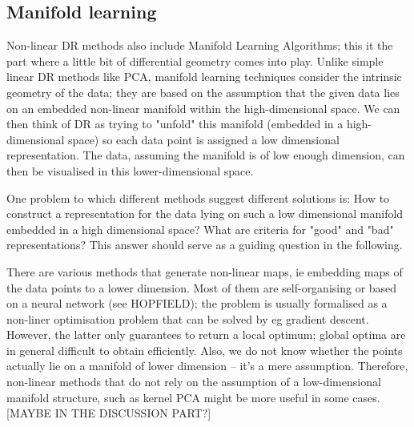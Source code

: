 \documentclass[journal, a4paper]{IEEEtran}
\begin{document}
\subsection{Manifold learning}

Non-linear DR methods also include Manifold Learning Algorithms; this it the part where a little bit of differential geometry comes into play.
Unlike simple linear DR methods like PCA, manifold learning techniques consider the intrinsic geometry of the data; they are based on the assumption that the given data lies on an embedded non-linear manifold within the high-dimensional space. We can then think of DR as trying to "unfold" this manifold (embedded in a high-dimensional space) so each data point is assigned a low dimensional representation.
The data, assuming the manifold is of low enough dimension, can then be visualised in this lower-dimensional space.

One problem to which different methods suggest different solutions is: How to construct a representation for the data lying on such a low dimensional manifold embedded in a high dimensional space? What are criteria for "good" and "bad" representations? This answer should serve as a guiding question in the following.


There are various methods that generate non-linear maps, ie embedding maps of the data points to a lower dimension. Most of them are self-organising or based on a neural network (see HOPFIELD); the problem is usually formalised as a non-liner optimisation problem that can be solved by eg gradient descent. However, the latter only guarantees to return a local optimum; global optima are in general difficult to obtain efficiently. Also, we do not know whether the points actually lie on a manifold of lower dimension -- it's a mere assumption.
Therefore, non-linear methods that do not rely on the assumption of a low-dimensional manifold structure, such as kernel PCA might be more useful in some cases. [MAYBE IN THE DISCUSSION PART?]

\end{document}
